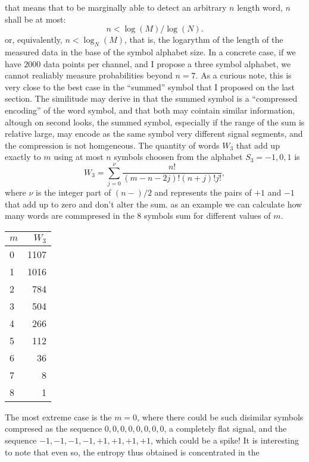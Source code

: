 \documentclass[10pt]{article}
\begin{document}
that means that to be marginally able to detect an arbitrary $n$ length word,
$n$ shall be at most:
\begin{equation}
  n < \log(M)/\log(N).
\end{equation}
or, equivalently, $ n < \log_N (M) $, that is, the logarythm of the length of
the measured data in the base of the symbol alphabet size. In a concrete case,
if we have $2000$ data points per channel, and I propose a three symbol
alphabet, we cannot realiably measure probabilities beyond $n=7$. As a curious
note, this is very close to the best case in the  ``summed'' symbol that
I proposed on the last section. The similitude may derive in that
the summed symbol is a ``compressed encoding'' of the word symbol, and that
both may cointain similar information, altough on second looks,
the summed symbol, especially if the range  of the sum is relative large, may
encode as the same symbol very different signal segments, and the compression
is not homgeneous. The quantity of words $W_3$ that add up exactly to $m$ using at most
$n$ symbols choosen from the alphabet $S_3={-1,0,1}$ is
\begin{equation}
  W_3=\sum_{j=0}^\nu \frac{n!}{(m-n-2j)!(n+j)!j!}, 
\end{equation}
where $\nu$ is the integer part of $(n-)/2$ and represents the pairs of $+1$ and
$-1$ that add up to zero and don't alter the sum. as an example we can calculate
how many words are commpresed in the 8 symbols sum for different values of $m$.
\begin{center}
  \begin{tabular}{ l | r }
    $m$ & $W_3$ \\
    \hline
    0 & 1107 \\
    1 & 1016 \\
    2 & 784 \\
    3 & 504 \\
    4 & 266 \\
    5 & 112 \\
    6 & 36 \\
    7 & 8 \\
    8 & 1 \\
    \hline
  \end{tabular}
\end{center}
The most extreme case is the $m=0$, where there could be such disimilar symbols
compresed as the sequence $0,0,0,0,0,0,0,0$, a completely flat signal,
and the sequence $-1,-1,-1,-1,+1,+1,+1,+1$, which could be a spike! It is interesting
to note that even so, the entropy thus obtained is concentrated in the
\end{document}
